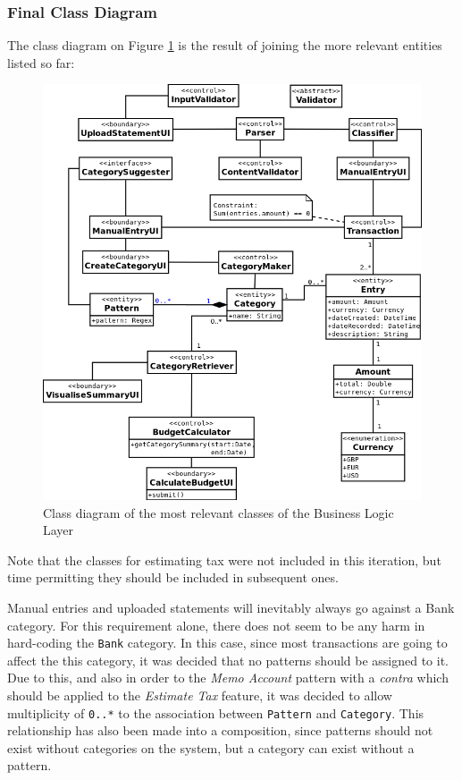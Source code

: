 \subsubsection{Final Class Diagram}
The class diagram on Figure \ref{fig:ClassDiagram.AllClasses} is the result of
joining the more relevant entities listed so far:
\begin{figure}[ht!]
  \begin{center}
    \includegraphics[width=15cm]{./contents/img/Class_Diagram_-_All_Classes.png}
  \end{center}
  \caption{Class diagram of the most relevant classes of the Business Logic Layer}
  \label{fig:ClassDiagram.AllClasses}
\end{figure}
\FloatBarrier

Note that the classes for estimating tax were not included in this iteration,
but time permitting they should be included in subsequent ones.

Manual entries and uploaded statements will inevitably always go against a Bank
category. For this requirement alone, there does not seem to be any harm in
hard-coding the \texttt{Bank} category. In this case, since most transactions
are going to affect the this category, it was decided that no patterns should
be assigned to it. Due to this, and also in order to the \emph{Memo Account}
pattern with a \emph{contra} which should be applied to the \emph{Estimate Tax}
feature, it was decided to allow multiplicity of \texttt{0..*} to the
association between \texttt{Pattern} and \texttt{Category}. This relationship
has also been made into a composition, since patterns should not exist without
categories on the system, but a category can exist without a pattern.


